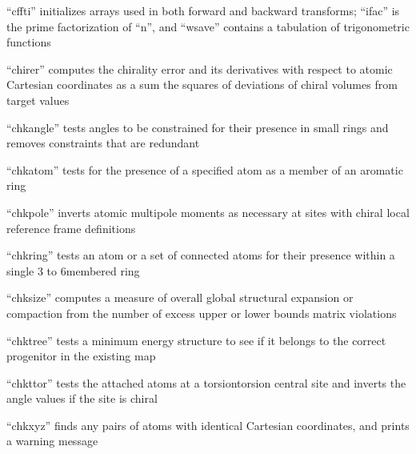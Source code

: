 \documentclass[letterpaper,11pt,english]{sphinxmanual}
\begin{document}


“cffti” initializes arrays used in both forward and backward
transforms; “ifac” is the prime factorization of “n”, and
“wsave” contains a tabulation of trigonometric functions



“chirer” computes the chirality error and its derivatives
with respect to atomic Cartesian coordinates as a sum the
squares of deviations of chiral volumes from target values


“chkangle” tests angles to be constrained for their presence
in small rings and removes constraints that are redundant


“chkatom” tests for the presence of a specified atom as a
member of an aromatic ring


“chkpole” inverts atomic multipole moments as necessary
at sites with chiral local reference frame definitions


“chkring” tests an atom or a set of connected atoms for
their presence within a single 3\sphinxhyphen{} to 6\sphinxhyphen{}membered ring


“chksize” computes a measure of overall global structural
expansion or compaction from the number of excess upper
or lower bounds matrix violations



“chktree” tests a minimum energy structure to see if it
belongs to the correct progenitor in the existing map


“chkttor” tests the attached atoms at a torsion\sphinxhyphen{}torsion central
site and inverts the angle values if the site is chiral


“chkxyz” finds any pairs of atoms with identical Cartesian
coordinates, and prints a warning message
\end{document}
